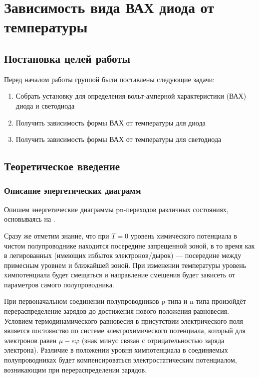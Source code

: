 \documentclass[a4paper, 12pt]{article}
\renewcommand{\phi}{\varphi} %
\begin{document}
\newpage

\section{Зависимость вида ВАХ диода от температуры}

\subsection{Постановка целей работы}

Перед началом работы группой были поставлены следующие задачи:

\begin{enumerate}
	\item Собрать установку для определения вольт-амперной характеристики (ВАХ) диода и светодиода
	
	\item Получить зависимость формы ВАХ от температуры для диода
	
	\item Получить зависимость формы ВАХ от температуры для светодиода
\end{enumerate}

\subsection{Теоретическое введение}

\subsubsection{Описание энергетических диаграмм}

Опишем энергетические диаграммы pn-переходов различных состояниях, основываясь на \cite{Glazkov}.

Сразу же отметим знание, что при $T = 0$ уровень химического потенциала в чистом полупроводнике находится посередине запрещенной зоной, в то время как в легированных (имеющих избыток электронов/дырок) --- посередине между примесным уровнем и ближайшей зоной. При изменении температуры уровень химпотенциала будет смещаться и направление смещения будет зависеть от параметров самого полупроводника.

При первоначальном соединении полупроводников p-типа и n-типа произойдёт перераспределение зарядов до достижения нового положения равновесия. Условием термодинамического равновесия в присутствии электрического поля является постоянство по системе электрохимического потенциала, который для электронов равен $\mu - e \phi$ (знак минус связан с отрицательностью заряда электрона). Различие в положении уровня химпотенциала в соединяемых полупроводниках будет компенсироваться электростатическим потенциалом, возникающим при перераспределении зарядов.
\end{document}
